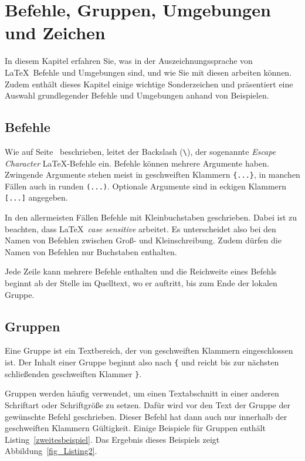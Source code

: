\chapter{Befehle, Gruppen, Umgebungen und Zeichen}
\label{BefehleGruppenUmgebungenZeichenKapitel}

In diesem Kapitel erfahren Sie, was in der Auszeichnungssprache von \LaTeX\ Befehle und Umgebungen sind, und wie Sie mit diesen arbeiten können. Zudem enthält dieses Kapitel einige wichtige Sonderzeichen und präsentiert eine Auswahl grundlegender Befehle und Umgebungen anhand von Beispielen.

\section{Befehle}

Wie auf Seite~\pageref{Seite_Befehl} beschrieben, leitet der Backslash (\verb!\!), der sogenannte \emph{Escape Character} LaTeX-Befehle ein. Befehle können mehrere Argumente haben. Zwingende Argumente stehen meist in geschweiften Klammern \verb!{...}!, in manchen Fällen
auch in runden \verb!(...)!. Optionale Argumente sind in eckigen Klammern \verb![...]! angegeben.


In den allermeisten Fällen Befehle mit Kleinbuchstaben geschrieben. Dabei ist zu beachten, dass \LaTeX\ \emph{case sensitive} arbeitet. Es unterscheidet also bei den Namen von Befehlen zwischen Groß- und Kleinschreibung. Zudem dürfen die Namen von Befehlen nur Buchstaben enthalten. 

Jede Zeile kann mehrere Befehle enthalten und die Reichweite eines Befehls beginnt ab der Stelle im Quelltext, wo er auftritt, bis zum Ende der lokalen Gruppe.


\section{Gruppen}

Eine Gruppe ist ein Textbereich, der von geschweiften Klammern eingeschlossen ist. Der Inhalt 
einer Gruppe beginnt also nach \verb!{! und reicht bis zur nächsten  schließenden geschweiften Klammer \verb!}!.

Gruppen werden häufig verwendet, um einen Textabschnitt in einer anderen Schriftart oder Schriftgröße zu setzen. Dafür wird vor den Text der Gruppe der gewünschte Befehl geschrieben. Dieser Befehl hat dann auch nur innerhalb der geschweiften Klammern Gültigkeit. Einige Beispiele für Gruppen enthält Listing~\ref{zweitesbeispiel}. Das Ergebnis dieses Beispiels zeigt Abbildung~\ref{fig_Listing2}.

